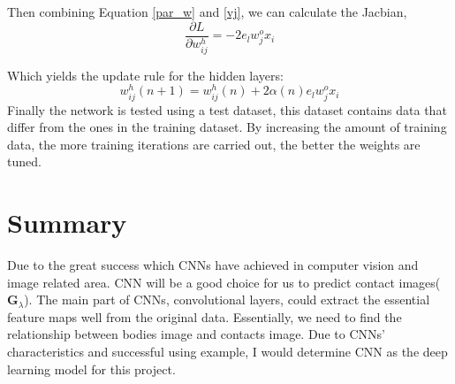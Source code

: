     Then combining Equation \ref{par_w} and \ref{vj}, we can calculate the Jacbian,
    \begin{equation}
        \frac{\partial L}{\partial w_{ij}^{h}} = -2e_l w_j^{o} x_i
    \end{equation} 

    Which yields the update rule for the hidden layers:
    \begin{equation}
        w_{ij}^{h}(n+1) = w_{ij}^{h}(n)+ 2\alpha(n)e_l w_j^{o} x_i
    \end{equation}
    Finally the network is tested using a test dataset, this dataset contains data that differ from the ones in the training dataset. By increasing the amount of training data, the more training iterations are carried out, the better the weights are tuned.

\section{Summary}
Due to the great success which CNNs have achieved in computer vision and image related area. CNN will be a good choice for us to predict contact images($\pmb{G}_{\lambda}$). The main part of CNNs, convolutional layers, could extract the essential feature maps well from the original data. Essentially, we need to find the relationship between bodies image and contacts image. Due to CNNs' characteristics and successful using example, I would determine CNN as the deep learning model for this project.
